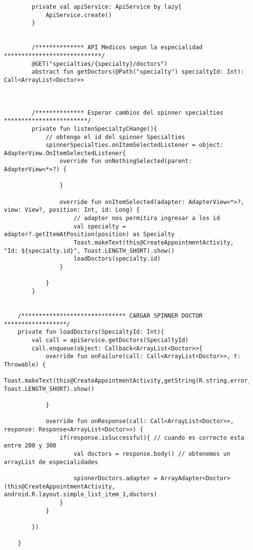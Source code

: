 \documentclass[a4paper]{article}
\begin{document}
	\lstset{style=mystyle,caption=Spinner de medicos,label=DescriptiveLabel}
	\begin{lstlisting}
		private val apiService: ApiService by lazy{
			ApiService.create()
		}
		
		
		/************** API Medicos segun la especialidad ****************************/
		@GET("specialties/{specialty}/doctors")
		abstract fun getDoctors(@Path("specialty") specialtyId: Int): Call<ArrayList<Doctor>>
		
		
		
		/************** Esperar cambios del spinner specialties ************************/
		private fun listenSpecialtyCHange(){
			// obtengo el id del spinner Specialties
			spinnerSpecialties.onItemSelectedListener = object: AdapterView.OnItemSelectedListener{
				override fun onNothingSelected(parent: AdapterView<*>?) {
					
				}
				
				override fun onItemSelected(adapter: AdapterView<*>?, view: View?, position: Int, id: Long) {
					// adapter nos permitira ingresar a los id
					val specialty = adapter?.getItemAtPosition(position) as Specialty
					Toast.makeText(this@CreateAppointmentActivity, "Id: ${specialty.id}", Toast.LENGTH_SHORT).show()
					loadDoctors(specialty.id)
				}
				
			}
		}
	
	
	/****************************** CARGAR SPINNER DOCTOR ******************/
	private fun loadDoctors(SpecialtyId: Int){
		val call = apiService.getDoctors(SpecialtyId)
		call.enqueue(object: Callback<ArrayList<Doctor>>{
			override fun onFailure(call: Call<ArrayList<Doctor>>, t: Throwable) {
				Toast.makeText(this@CreateAppointmentActivity,getString(R.string.error_loading_doctors), Toast.LENGTH_SHORT).show()
				
			}
			
			override fun onResponse(call: Call<ArrayList<Doctor>>, response: Response<ArrayList<Doctor>>) {
				if(response.isSuccessful){ // cuando es correcto esta entre 200 y 300
					val doctors = response.body() // obtenemos un arrayList de especialidades
					
					spinnerDoctors.adapter = ArrayAdapter<Doctor>(this@CreateAppointmentActivity, android.R.layout.simple_list_item_1,doctors)
				}
			}
			
		})
		
	}
		
	\end{lstlisting}
	
	
	
	
	
	
	
\end{document}
